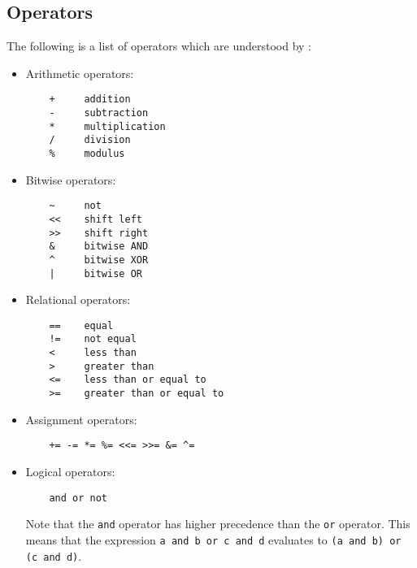 \subsection{Operators}
The following is a list of operators which are understood by \tao:

\begin{itemize}
\item
Arithmetic operators:
\begin{verbatim}
    +     addition
    -     subtraction
    *     multiplication
    /     division
    %     modulus
\end{verbatim}
\begin{iftex}
\Operator{\~}
\Operator{<<}
\Operator{>>}
\Operator{\&}
\Operator{\^}
\end{iftex}

\item
Bitwise operators:
\begin{verbatim}
    ~     not
    <<    shift left
    >>    shift right
    &     bitwise AND
    ^     bitwise XOR
    |     bitwise OR
\end{verbatim}
\begin{iftex}
\Operator{\~}
\Operator{<<}
\Operator{>>}
\Operator{\&}
\Operator{\^}
\end{iftex}

\item
Relational operators:
\begin{verbatim}
    ==    equal
    !=    not equal
    <     less than
    >     greater than
    <=    less than or equal to 
    >=    greater than or equal to
\end{verbatim}
\begin{iftex}
\Operator{==}
\Operator{!=}
\Operator{<}
\Operator{>}
\Operator{<=}
\Operator{>=}
\end{iftex}

\item 
Assignment operators:
\begin{verbatim}
    += -= *= %= <<= >>= &= ^=
\end{verbatim}
\begin{iftex}
\Operator{+=}
\Operator{-=}
\Operator{*=}
\Operator{\%=}
\Operator{<<=}
\Operator{>>=}
\Operator{\&=}
\end{iftex}

\item
Logical operators:
\begin{verbatim}
    and or not
\end{verbatim}

Note that the \verb|and| operator has higher precedence than the \verb|or|
operator. This means that the expression \verb|a and b or c and d|
evaluates to \verb|(a and b) or (c and d)|.
\end{itemize}

